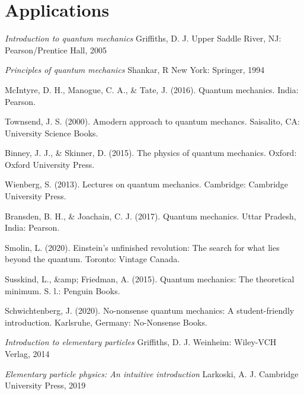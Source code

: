 \documentclass[a4paper,12pt]{book}
\begin{document}
\part{Applications}








%
%
\backmatter
\begin{thebibliography}{9}
	
	 \emph{Introduction to quantum mechanics}
	\newblock Griffiths, D. J.
	\newblock Upper Saddle River, NJ: Pearson/Prentice Hall, 2005
	
	 \emph{Principles of quantum mechanics}
	\newblock Shankar, R
	\newblock New York: Springer, 1994
	
	 McIntyre, D. H., Manogue, C. A., \& Tate, J. (2016). Quantum mechanics. India: Pearson.
	
	 Townsend, J. S. (2000). Amodern approach to quantum mechancs. Saisalito, CA: University Science Books.
	
	  Binney, J. J., \& Skinner, D. (2015). The physics of quantum mechanics. Oxford: Oxford University Press.
	
	 Wienberg, S. (2013). Lectures on quantum mechanics. Cambridge: Cambridge University Press.
	
	  Bransden, B. H., \& Joachain, C. J. (2017). Quantum mechanics. Uttar Pradesh, India: Pearson.
	
	 Smolin, L. (2020). Einstein's unfinished revolution: The search for what lies beyond the quantum. Toronto: Vintage Canada.
	
	 Susskind, L., \&amp; Friedman, A. (2015). Quantum mechanics: The theoretical minimum. S. l.: Penguin Books.
	
	 Schwichtenberg, J. (2020). No-nonsense quantum mechanics: A student-friendly introduction. Karlsruhe, Germany: No-Nonsense Books.
	
	 \emph{Introduction to elementary particles}
	\newblock Griffiths, D. J.
	\newblock Weinheim: Wiley-VCH Verlag, 2014
	
	 \emph{Elementary particle physics: An intuitive introduction}
	\newblock Larkoski, A. J.
	\newblock Cambridge University Press, 2019
	

\end{thebibliography}
\end{document}
